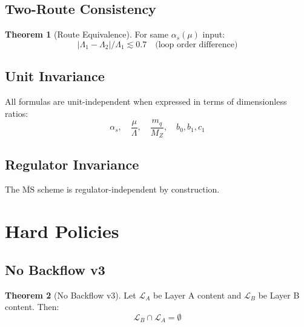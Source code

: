 \documentclass[11pt,a4paper]{article}
\theoremstyle{definition}
\newtheorem{theorem}{Theorem}[section]
\begin{document}
\subsection{Two-Route Consistency}
\label{subsec:two-route-inv}

\begin{theorem}[Route Equivalence]
\label{thm:route-equiv-canon}
For same $\alpha_s(\mu)$ input:
\begin{equation}
\label{eq:route-equiv-canon}
|\Lambda_1 - \Lambda_2| / \Lambda_1 \lesssim 0.7 \quad \text{(loop order difference)}
\end{equation}
\end{theorem}

\subsection{Unit Invariance}
\label{subsec:unit-inv}

All formulas are unit-independent when expressed in terms of dimensionless ratios:
\begin{equation}
\label{eq:unit-inv}
\alpha_s, \quad \frac{\mu}{\Lambda}, \quad \frac{m_q}{M_Z}, \quad b_0, b_1, c_1
\end{equation}

\subsection{Regulator Invariance}
\label{subsec:regulator-inv}

The $\overline{\text{MS}}$ scheme is regulator-independent by construction.

\section{Hard Policies}
\label{sec:policies}

\subsection{No Backflow v3}
\label{subsec:no-backflow}

\begin{theorem}[No Backflow v3]
\label{thm:no-backflow-canon}
Let $\mathcal{L}_A$ be Layer A content and $\mathcal{L}_B$ be Layer B content. Then:
\begin{equation}
\label{eq:no-backflow-canon}
\boxed{\mathcal{L}_B \cap \mathcal{L}_A = \emptyset}
\end{equation}
\end{theorem}
\end{document}
